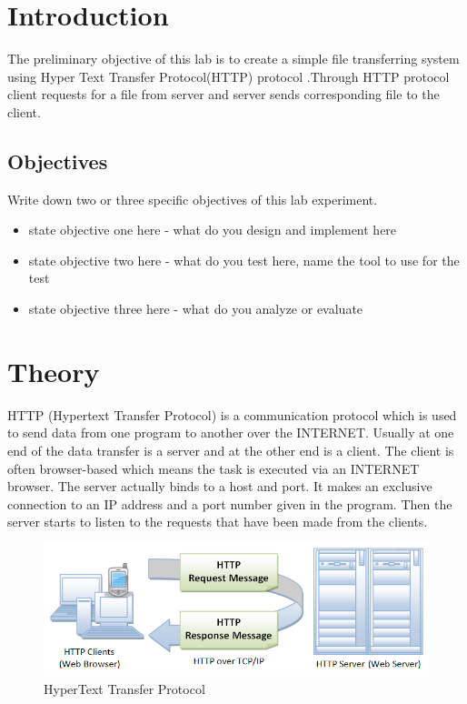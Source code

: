 \documentclass[11pt]{article}
\begin{document}
\section{Introduction}
The preliminary objective of this lab is to create a simple file transferring system using Hyper Text Transfer Protocol(HTTP) protocol .Through HTTP protocol client requests for a file from server and server sends corresponding file to the client.

\subsection{Objectives}
Write down two or three specific objectives of this lab experiment.
\begin{itemize}
    \item state objective one here - what do you design and implement here
    \item state objective two here - what do you test here, name the tool to use for the test
    \item state objective three here - what do you analyze or evaluate
\end{itemize}
\section{Theory}
HTTP (Hypertext Transfer Protocol) is a communication protocol which is used
to send data from one program to another over the INTERNET. Usually at one
end of the data transfer is a server and at the other end is a client. The client
is often browser-based which means the task is executed via an INTERNET
browser. The server actually binds to a host and port. It makes an exclusive
connection to an IP address and a port number given in the program. Then the
server starts to listen to the requests that have been made from the clients.

\begin{figure}[!h]
\centering
\includegraphics[width=\textwidth]{http.png}
\caption{HyperText Transfer Protocol}
\end{figure}
\end{document}
